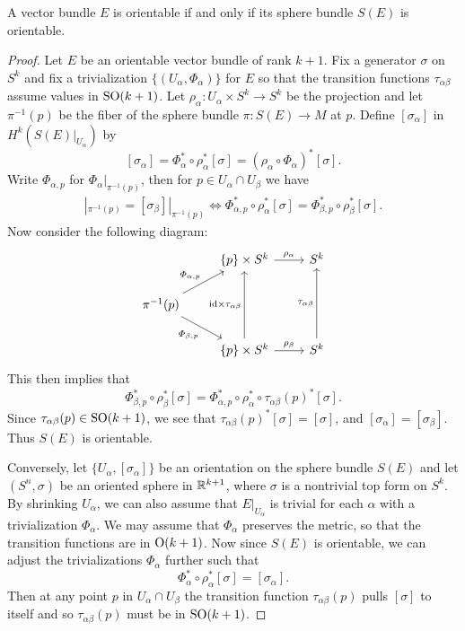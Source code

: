 \begin{proposition}
A vector bundle $E$ is orientable if and only if its sphere bundle $S(E)$ is orientable.
\end{proposition}
\begin{proof}
Let $E$ be an orientable vector bundle of rank $k+1$. Fix a generator $\sigma$ on $S^k$ and fix a trivialization $\{(U_\alpha,\varPhi_\alpha)\}$ for $E$ so that the 
transition functions $\tau_{\alpha\beta}$ assume values in $\mathrm{SO}(k+1)$. Let $\rho_\alpha:U_\alpha\times S^k\to S^k$ be the projection and let $\pi^{-1}(p)$ be the fiber 
of the sphere bundle $\pi:S(E)\to M$ at $p$. Define $[\sigma_\alpha]$ in $H^k(S(E)|_{U_\alpha})$ by
\[[\sigma_\alpha]=\varPhi_\alpha^*\circ\rho_\alpha^*[\sigma]=(\rho_\alpha\circ\varPhi_\alpha)^*[\sigma].\]
Write $\varPhi_{\alpha,p}$ for $\varPhi_\alpha|_{\pi^{-1}(p)}$, then for $p\in U_\alpha\cap U_\beta$ we have
\begin{align*}
[\sigma_\alpha]|_{\pi^{-1}(p)}=[\sigma_\beta]|_{\pi^{-1}(p)}\iff\varPhi_{\alpha,p}^*\circ\rho_\alpha^*[\sigma]=\varPhi_{\beta,p}^*\circ\rho_\beta^*[\sigma].
\end{align*}
Now consider the following diagram:
\[\begin{tikzcd}
&\{p\}\times S^k\ar[r,"\rho_\alpha"]&S^k\\
\pi^{-1}(p)\ar[ru,"\varPhi_{\alpha,p}"]\ar[rd,swap,"\varPhi_{\beta,p}"]&&\\
&\{p\}\times S^k\ar[r,"\rho_\beta"]\ar[uu,"\id\times\tau_{\alpha\beta}"]&S^k\ar[uu,"\tau_{\alpha\beta}"]
\end{tikzcd}\]
This then implies that
\[\varPhi_{\beta,p}^*\circ\rho_\beta^*[\sigma]=\varPhi_{\alpha,p}^*\circ\rho_\alpha^*\circ\tau_{\alpha\beta}(p)^*[\sigma].\]
Since $\tau_{\alpha\beta}(p)\in\mathrm{SO}(k+1)$, we see that $\tau_{\alpha\beta}(p)^*[\sigma]=[\sigma]$, and $[\sigma_\alpha]=[\sigma_\beta]$. Thus $S(E)$ is orientable.\par
Conversely, let $\{U_\alpha,[\sigma_\alpha]\}$ be an orientation on the sphere bundle $S(E)$ and let $(S^n,\sigma)$ be an oriented sphere in $\mathbb{R}^{k+1}$, where $\sigma$ 
is a nontrivial top form on $S^k$. By shrinking $U_\alpha$, we can also assume that $E|_{U_\alpha}$ is trivial for each $\alpha$ with a trivialization $\varPhi_\alpha$. 
We may assume that $\varPhi_\alpha$ preserves the metric, so that the transition functions are in $\mathrm{O}(k+1)$. Now since $S(E)$ is orientable, we can adjust the 
trivializations $\varPhi_\alpha$ further such that
\[\varPhi_\alpha^*\circ\rho_\alpha^*[\sigma]=[\sigma_\alpha].\]
Then at any point $p$ in $U_\alpha\cap U_\beta$ the transition function $\tau_{\alpha\beta}(p)$ pulls $[\sigma]$ to itself and so $\tau_{\alpha\beta}(p)$ must be in $\mathrm{SO}(k+1)$.
\end{proof}
